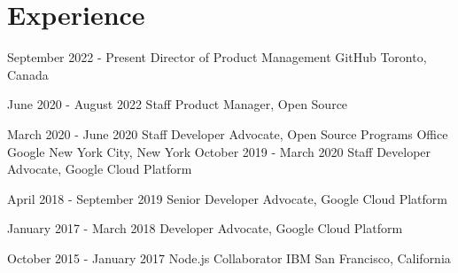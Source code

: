 \documentclass[10pt,a4paper,sans]{moderncv}   %
\begin{document}
\makecvtitle

\section{Experience}

\cventry
  {September 2022 - Present}
  {Director of Product Management}
  {GitHub}
  {Toronto, Canada}{}
  {}

\cventry
  {June 2020 - August 2022}
  {Staff Product Manager, Open Source}
  {}
  {}{}
  {}

\cventry
  {March 2020 - June 2020}
  {Staff Developer Advocate, Open Source Programs Office}
  {Google}
  {New York City, New York}{}
  {}
\cventry
  {October 2019 - March 2020}
  {Staff Developer Advocate, Google Cloud Platform}
  {}
  {}{}
  {}

\cventry
  {April 2018 - September 2019}
  {Senior Developer Advocate, Google Cloud Platform}
  {}
  {}{}
  {}

\cventry
  {January 2017 - March 2018}
  {Developer Advocate, Google Cloud Platform}
  {}
  {}{}
  {}

  \cventry
  {October 2015 - January 2017}
  {Node.js Collaborator}
  {IBM}
  {San Francisco, California}{}
  {}



%
\end{document}
